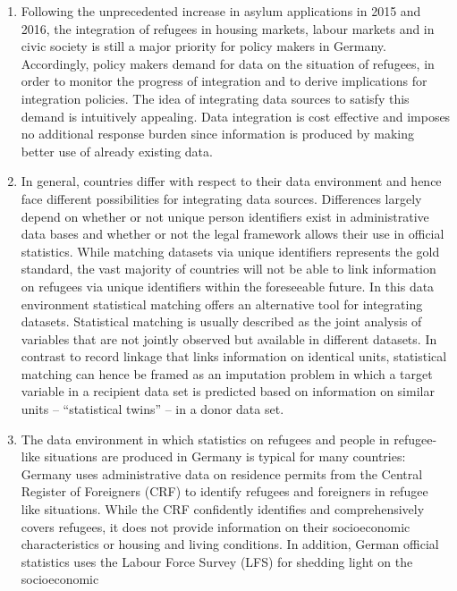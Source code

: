 \documentclass[
]{article}
\begin{document}
\begin{enumerate}
\def\labelenumi{\arabic{enumi}.}
\setcounter{enumi}{261}
\item
  Following the unprecedented increase in asylum applications in 2015
  and 2016, the integration of refugees in housing markets, labour
  markets and in civic society is still a major priority for policy
  makers in Germany. Accordingly, policy makers demand for data on the
  situation of refugees, in order to monitor the progress of
  integration and to derive implications for integration policies. The
  idea of integrating data sources to satisfy this demand is
  intuitively appealing. Data integration is cost effective and
  imposes no additional response burden since information is produced
  by making better use of already existing data.
\item
  In general, countries differ with respect to their data environment
  and hence face different possibilities for integrating data sources.
  Differences largely depend on whether or not unique person
  identifiers exist in administrative data bases and whether or not
  the legal framework allows their use in official statistics. While
  matching datasets via unique identifiers represents the gold
  standard, the vast majority of countries will not be able to link
  information on refugees via unique identifiers within the
  foreseeable future. In this data environment statistical matching
  offers an alternative tool for integrating datasets. Statistical
  matching is usually described as the joint analysis of variables
  that are not jointly observed but available in different datasets.
  In contrast to record linkage that links information on identical
  units, statistical matching can hence be framed as an imputation
  problem in which a target variable in a recipient data set is
  predicted based on information on similar units -- ``statistical
  twins'' -- in a donor data set.
\item
  The data environment in which statistics on refugees and people in
  refugee-like situations are produced in Germany is typical for many
  countries: Germany uses administrative data on residence permits
  from the Central Register of Foreigners (CRF) to identify refugees
  and foreigners in refugee like situations. While the CRF confidently
  identifies and comprehensively covers refugees, it does not provide
  information on their socioeconomic characteristics or housing and
  living conditions. In addition, German official statistics uses the
  Labour Force Survey (LFS) for shedding light on the socioeconomic

\end{enumerate}
\end{document}
